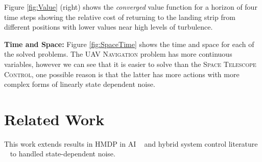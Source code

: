\documentclass[letterpaper]{article}
\begin{document}
Figure \ref{fig:Value} (right) shows the \emph{converged} value
function for a horizon of four time steps showing the 
relative cost of returning to the landing strip from different
positions with lower values near high levels of turbulence.

\textbf{Time and Space:} Figure \ref{fig:SpaceTime} shows the time and
space for each of the solved problems.  The \textsc{UAV Navigation}
problem has more continuous variables, however we can see that it is
easier to solve than the \textsc{Space Telescope Control}, one
possible reason is that the latter has more actions with more
complex forms of linearly state dependent noise.

\section{Related Work}



This work extends results in HMDP in AI
~\cite{boyan01,feng04,li05,kveton06,phase07,hao09,sdp_aaai} and hybrid
system control literature ~\cite{Henzinger:1997,Hu:2000,DeSHee:2009}
to handled state-dependent noise.
\end{document}
